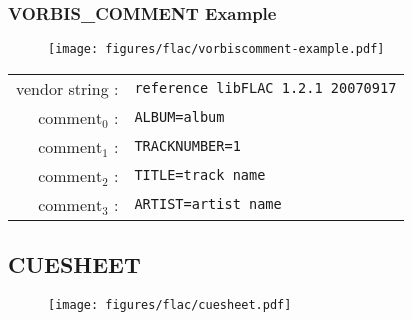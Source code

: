 \subsubsection{VORBIS\_COMMENT Example}
\begin{figure}[h]
  \texttt{[image: figures/flac/vorbiscomment-example.pdf]}
\end{figure}
\begin{table}[h]
{
\begin{tabular}{rl}
  vendor string : & \texttt{reference libFLAC 1.2.1 20070917} \\
  $\text{comment}_0$ : & \texttt{ALBUM=album} \\
  $\text{comment}_1$ : & \texttt{TRACKNUMBER=1} \\
  $\text{comment}_2$ : & \texttt{TITLE=track name} \\
  $\text{comment}_3$ : & \texttt{ARTIST=artist name} \\
\end{tabular}
}
\end{table}

\clearpage

\subsection{CUESHEET}
\begin{figure}[h]
\texttt{[image: figures/flac/cuesheet.pdf]}
\end{figure}




\clearpage


